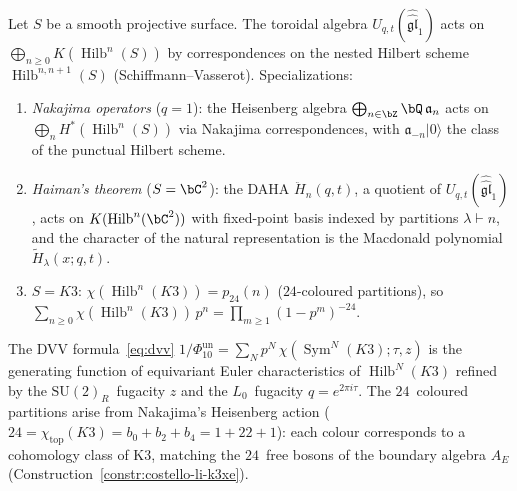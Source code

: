 \begin{theorem}
\label{thm:bridge-sv-toroidal}
\ClaimStatusProvedElsewhere
{}
Let $S$ be a smooth projective surface. The toroidal algebra
$U_{q,t}(\hat{\hat{\mathfrak{gl}}}_1)$ acts on
$\bigoplus_{n \geq 0} K({\operatorname{Hilb}}^n(S))$
by correspondences on the nested Hilbert scheme
$\operatorname{Hilb}^{n,n+1}(S)$ \textup{(}Schiffmann--Vasserot\textup{)}.
Specializations:
\begin{enumerate}[label=\textup{(\roman*)}]
\item \emph{Nakajima operators} \textup{(}$q = 1$\textup{)}: the
 Heisenberg algebra $\bigoplus_{n \in \bZ} \bQ\,\mathfrak{a}_n$
 acts on $\bigoplus_n H^*(\operatorname{Hilb}^n(S))$ via
 Nakajima correspondences,
 with $\mathfrak{a}_{-n}|0\rangle$
 the class of the punctual Hilbert scheme.
\item \emph{Haiman's theorem} \textup{(}$S = \bC^2$\textup{)}:
 the DAHA $\ddot{H}_n(q,t)$, a quotient of
 $U_{q,t}(\hat{\hat{\mathfrak{gl}}}_1)$, acts on
 $K(\operatorname{Hilb}^n(\bC^2))$ with fixed-point basis
 indexed by partitions $\lambda \vdash n$, and the
 character of the natural representation is the Macdonald
 polynomial $\widetilde{H}_\lambda(x;q,t)$.
\item \emph{$S = K3$}:
 $\chi(\operatorname{Hilb}^n(K3)) = p_{24}(n)$
 \textup{(}$24$-coloured partitions\textup{)}, so
 $\sum_{n \geq 0} \chi(\operatorname{Hilb}^n(K3))\,p^n
 = \prod_{m \geq 1} (1 - p^m)^{-24}$.
\end{enumerate}
\end{theorem}

\begin{proposition}
\label{prop:bridge-dmvv-hilb}
The DVV formula~\eqref{eq:dvv}
\(1/\Phi_{10}^{\mathrm{un}} = \sum_N p^N\,\chi(\operatorname{Sym}^N(K3);\tau,z)\)
is the generating function of equivariant Euler characteristics of
$\operatorname{Hilb}^N(K3)$ refined by the $\mathrm{SU}(2)_R$~fugacity
$z$ and the $L_0$~fugacity $q = e^{2\pi i\tau}$. The $24$~coloured
partitions arise from Nakajima's Heisenberg action
\textup{(}$24 = \chi_{\mathrm{top}}(K3) = b_0 + b_2 + b_4 = 1 + 22 + 1$\textup{)}:
each colour corresponds to a cohomology class of K3, matching the
$24$~free bosons of the boundary algebra $A_E$
\textup{(}Construction~\textup{\ref{constr:costello-li-k3xe})}.
\end{proposition}

